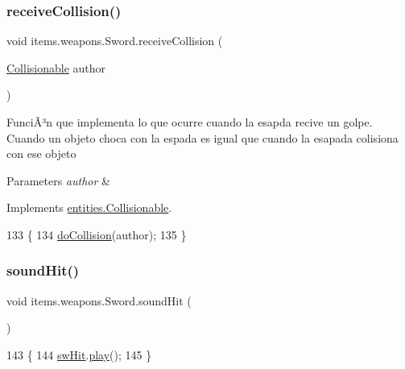 \subsubsection{\texorpdfstring{receive\+Collision()}{receiveCollision()}}
{\footnotesize\ttfamily void items.\+weapons.\+Sword.\+receive\+Collision (\begin{DoxyParamCaption}\item[{\mbox{\hyperlink{interfaceentities_1_1_collisionable}{Collisionable}}}]{author }\end{DoxyParamCaption})\hspace{0.3cm}{\ttfamily [inline]}}

FunciÃ³n que implementa lo que ocurre cuando la esapda recive un golpe. Cuando un objeto choca con la espada es igual que cuando la esapada colisiona con ese objeto


\begin{DoxyParams}{Parameters}
{\em author} & \\
\hline
\end{DoxyParams}


Implements \mbox{\hyperlink{interfaceentities_1_1_collisionable_a956a85182fef376af333622e844342e3}{entities.\+Collisionable}}.


\begin{DoxyCode}
133       \{
134         \mbox{\hyperlink{classitems_1_1weapons_1_1_sword_a3b4292b936e2d5e5aad2b1f0b2c2f935}{doCollision}}(author);
135     \}
\end{DoxyCode}
\mbox{\label{classitems_1_1weapons_1_1_sword_aa3aca5fbc0c268828584bcf4c32d9a4c}} 
\subsubsection{\texorpdfstring{sound\+Hit()}{soundHit()}}
{\footnotesize\ttfamily void items.\+weapons.\+Sword.\+sound\+Hit (\begin{DoxyParamCaption}{ }\end{DoxyParamCaption})\hspace{0.3cm}{\ttfamily [inline]}}


\begin{DoxyCode}
143                            \{
144         \mbox{\hyperlink{classitems_1_1weapons_1_1_sword_a83b89e36fa2e2f6f6d6aa6827657cbb5}{swHit}}.\mbox{\hyperlink{classorg_1_1newdawn_1_1slick_1_1_sound_aed5db39a69e8ed57eb14053f7588ab90}{play}}();
145     \}
\end{DoxyCode}


